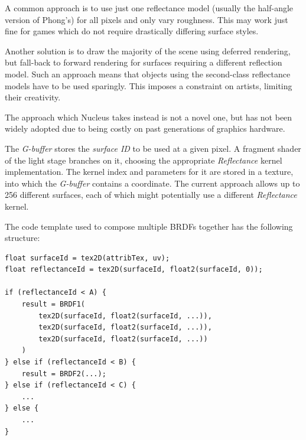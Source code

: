 A common approach is to use just one reflectance model (usually the half-angle version of Phong's) for all pixels and only vary roughness. This may work just fine for games which do not require drastically differing surface styles.

Another solution is to draw the majority of the scene using deferred rendering, but fall-back to forward rendering for surfaces requiring a different reflection model. Such an approach means that objects using the second-class reflectance models have to be used sparingly. This imposes a constraint on artists, limiting their creativity.

The approach which Nucleus takes instead is not a novel one, but has not been widely adopted due to being costly on past generations of graphics hardware.

The \emph{G-buffer} stores the \emph{surface ID} to be used at a given pixel. A fragment shader of the light stage branches on it, choosing the appropriate \emph{Reflectance} kernel implementation. The kernel index and parameters for it are stored in a texture, into which the \emph{G-buffer} contains a coordinate. The current approach allows up to 256 different surfaces, each of which might potentially use a different \emph{Reflectance} kernel.

The code template used to compose multiple BRDFs together has the following structure:

\noindent\begin{minipage}{\textwidth}
\begin{lstlisting}[frame=single]
float surfaceId = tex2D(attribTex, uv);
float reflectanceId = tex2D(surfaceId, float2(surfaceId, 0));
 
if (reflectanceId < A) {
    result = BRDF1(
        tex2D(surfaceId, float2(surfaceId, ...)),
        tex2D(surfaceId, float2(surfaceId, ...)),
        tex2D(surfaceId, float2(surfaceId, ...))
    )
} else if (reflectanceId < B) {
    result = BRDF2(...);
} else if (reflectanceId < C) {
    ...
} else {
    ...
}
\end{lstlisting}
\end{minipage}

